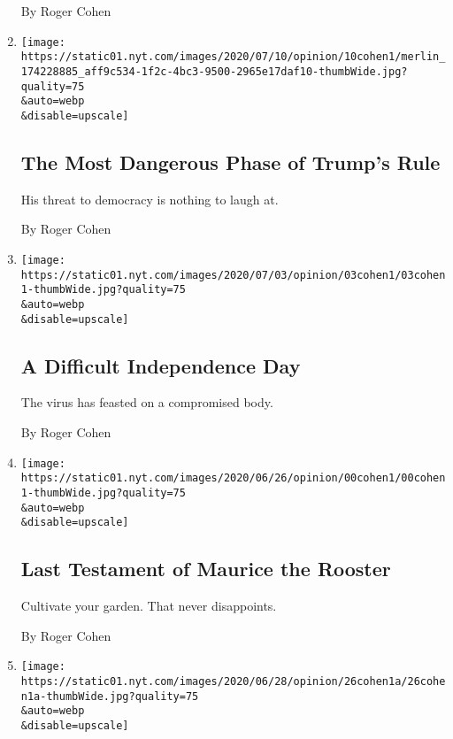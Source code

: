 \begin{enumerate}
  By Roger Cohen
\item
  \href{/2020/07/10/opinion/trump-nationalism.html}{}

  \texttt{[image: https://static01.nyt.com/images/2020/07/10/opinion/10cohen1/merlin\_174228885\_aff9c534-1f2c-4bc3-9500-2965e17daf10-thumbWide.jpg?quality=75\\\&auto=webp\\\&disable=upscale]}

  \hypertarget{the-most-dangerous-phase-of-trumps-rule}{%
  \subsection{The Most Dangerous Phase of Trump's
  Rule}\label{the-most-dangerous-phase-of-trumps-rule}}

  His threat to democracy is nothing to laugh at.

  By Roger Cohen
\item
  \href{/2020/07/02/opinion/july-4th-coronavirus.html}{}

  \texttt{[image: https://static01.nyt.com/images/2020/07/03/opinion/03cohen1/03cohen1-thumbWide.jpg?quality=75\\\&auto=webp\\\&disable=upscale]}

  \hypertarget{a-difficult-independence-day}{%
  \subsection{A Difficult Independence
  Day}\label{a-difficult-independence-day}}

  The virus has feasted on a compromised body.

  By Roger Cohen
\item
  \href{/2020/06/26/opinion/maurice-rooster-france.html}{}

  \texttt{[image: https://static01.nyt.com/images/2020/06/26/opinion/00cohen1/00cohen1-thumbWide.jpg?quality=75\\\&auto=webp\\\&disable=upscale]}

  \hypertarget{last-testament-of-maurice-the-rooster}{%
  \subsection{Last Testament of Maurice the
  Rooster}\label{last-testament-of-maurice-the-rooster}}

  Cultivate your garden. That never disappoints.

  By Roger Cohen
\item
  \href{/2020/06/26/opinion/let-freedom-ring-from-georgia.html}{}

  \texttt{[image: https://static01.nyt.com/images/2020/06/28/opinion/26cohen1a/26cohen1a-thumbWide.jpg?quality=75\\\&auto=webp\\\&disable=upscale]}


\end{enumerate}
